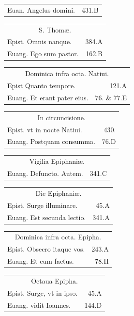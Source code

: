\documentclass[a5paper,10pt]{book}
\def\ae{æ}
\begin{document}
\begin{multicols*}{2}
\begin{tabular}{l r}
Euan. Angelus domini. & 431.B\\
\end{tabular}
\begin{tabular}{l r}
\multicolumn{2}{c}{\color{red} S. Thom\ae .}\\
Epist. Omnis nanque. & 384.A\\
Euang. Ego sum pastor. & 162.B\\
\end{tabular}
\begin{tabular}{l r}
\multicolumn{2}{c}{\color{red} Dominica infra octa. Natiui.}\\
Epist Quanto tempore. & 121.A\\
Euang. Et erant pater eius. & 76. \& 77.E\\%
\end{tabular}
\begin{tabular}{l r}
\multicolumn{2}{c}{\color{red} In circuncisione.}\\
Epist. vt in nocte Natiui. & 430.\\
Euang. Postquam consumma. & 76.D\\
\end{tabular}
\begin{tabular}{l r}
\multicolumn{2}{c}{\color{red} Vigilia Epiphani\ae .}\\
Euang. Defuncto. Autem. & 341.C\\
\end{tabular}
\begin{tabular}{l r}
\multicolumn{2}{c}{\color{red} Die Epiphani\ae .}\\
Epist. Surge illuminare. & 45.A\\
Euang. Est secunda lectio. & 341.A\\
\end{tabular}
\begin{tabular}{l r}
\multicolumn{2}{c}{\color{red} Dominica infra octa. Epipha.}\\
Epist. Obsecro itaque vos. & 243.A\\
Euang. Et cum factus. & 78.H\\
\end{tabular}
\begin{tabular}{l r}
\multicolumn{2}{c}{\color{red} Octaua Epipha.}\\
Epist. Surge, vt in ipso. & 45.A\\
Euang. vidit Ioannes. & 144.D\\
\end{tabular}
\begin{tabular}{l r}

\end{tabular}
\end{multicols*}
\end{document}
